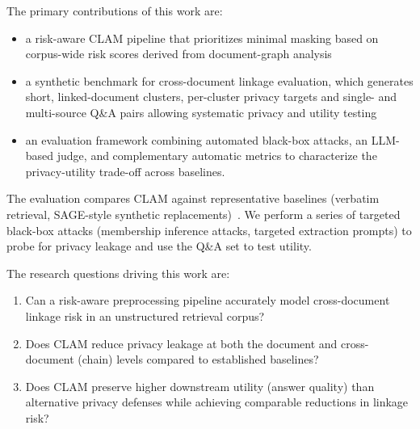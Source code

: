 The primary contributions of this work are:
\begin{itemize}
  \item a risk-aware CLAM pipeline that prioritizes minimal masking based on corpus-wide risk scores derived from document-graph analysis
  \item a synthetic benchmark for cross-document linkage evaluation, which generates short, linked-document clusters, per-cluster privacy targets and single- and multi-source Q\&A pairs allowing systematic privacy and utility testing
  \item an evaluation framework combining automated black-box attacks, an LLM-based judge, and complementary automatic metrics to characterize the privacy-utility trade-off across baselines.
\end{itemize}

The evaluation compares CLAM against representative baselines (verbatim retrieval, SAGE-style synthetic replacements)~\cite{ragSAGE}. We perform a series of targeted black-box attacks (membership inference attacks, targeted extraction prompts) to probe for privacy leakage and use the Q\&A set to test utility.

The research questions driving this work are:
\begin{enumerate}
  \item Can a risk-aware preprocessing pipeline accurately model cross-document linkage risk in an unstructured retrieval corpus?
  \item Does CLAM reduce privacy leakage at both the document and cross-document (chain) levels compared to established baselines?
  \item Does CLAM preserve higher downstream utility (answer quality) than alternative privacy defenses while achieving comparable reductions in linkage risk?
\end{enumerate}



